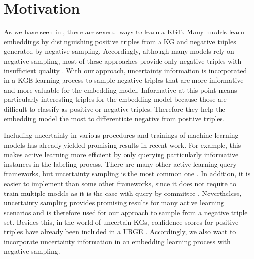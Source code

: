 \section{Motivation} 
\label{sec:motivation}
As we have seen in , there are several ways to learn a \ac{KGE}.
Many models learn embeddings by distinguishing positive triples from a \ac{KG} and negative triples generated by negative sampling.
Accordingly, although many models rely on negative sampling, most of these approaches provide only negative triples with insufficient quality \cite{qiannegative}.
With our approach, uncertainty information is incorporated in a \ac{KGE} learning process to sample negative triples that are more informative and more valuable for the embedding model.
Informative at this point means particularly interesting triples for the embedding model because those are difficult to classify as positive or negative triples.
Therefore they help the embedding model the most to differentiate negative from positive triples.

Including uncertainty in various procedures and trainings of machine learning models has already yielded promising results in recent work.
For example, this makes active learning more efficient by only querying particularly informative instances in the labeling process.
There are many other active learning query frameworks, but uncertainty sampling is the most common one \cite{Settles2009ActiveLL}.
In addition, it is easier to implement than some other frameworks, since it does not require to train multiple models as it is the case with query-by-committee  \cite{Settles2009ActiveLL}.
Nevertheless, uncertainty sampling provides promising results for many active learning scenarios and is therefore used for our approach to sample from a negative triple set.
Besides this, in the world of uncertain \acp{KG}, confidence scores for positive triples have already been included in a \ac{URGE} \cite{UKGE}.
Accordingly, we also want to incorporate uncertainty information in an embedding learning process with negative sampling.

